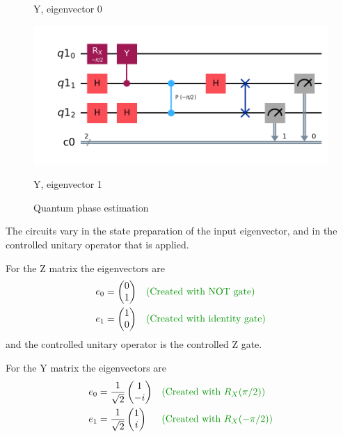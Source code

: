 \documentclass[12pt]{extarticle}
\begin{document}
\begin{figure}[htbp]
\begin{minipage}[b]{0.45\textwidth}
        \captionsetup{labelformat=empty}
        \caption{Y, eigenvector 0}
    \end{minipage}
    \hfill
    \begin{minipage}[b]{0.45\textwidth}
        \centering
        \includegraphics[width=\textwidth]{images/homework3_q2_qpe_y_e1.png}
        \captionsetup{labelformat=empty}
        \caption{Y, eigenvector 1}
    \end{minipage}
    \caption{Quantum phase estimation}
    \label{fig:2x2grid}
\end{figure}

The circuits vary in the state preparation of the input eigenvector,
and in the controlled unitary operator that is applied.

For the Z matrix the eigenvectors are
\begin{align*}
e_0 &= \begin{pmatrix} 0 \\ 1 \end{pmatrix} && \expl{Created with NOT gate}\\
e_1 &= \begin{pmatrix} 1 \\ 0 \end{pmatrix} && \expl{Created with identity gate}\\
\end{align*}
and the controlled unitary operator is the controlled Z gate.

For the Y matrix the eigenvectors are
\begin{align*}
e_0 &= \frac{1}{\sqrt{2}}\begin{pmatrix} 1 \\ -i \end{pmatrix} && \expl{Created with $R_X(\pi/2)$}\\
e_1 &= \frac{1}{\sqrt{2}}\begin{pmatrix} 1 \\ i \end{pmatrix} && \expl{Created with $R_X(-\pi/2)$}\\
\end{align*}
\end{document}
